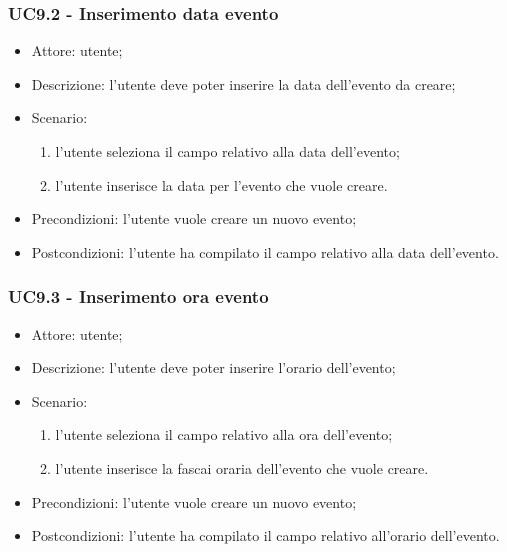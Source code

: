 \subsubsection{UC9.2 - Inserimento data evento} \label{sec: UC9.2}
\begin{itemize}
    \item Attore: utente;
    \item Descrizione: l'utente deve poter inserire la data dell'evento da creare;
    \item Scenario:
        \begin{enumerate}
        \item l'utente seleziona il campo relativo alla data dell'evento;
        \item l'utente inserisce la data per l'evento che vuole creare.
        \end{enumerate}
    
    \item Precondizioni: l'utente vuole creare un nuovo evento;
    \item Postcondizioni: l'utente ha compilato il campo relativo alla data dell'evento.
\end{itemize}


\subsubsection{UC9.3 - Inserimento ora evento} \label{sec: UC9.3}
\begin{itemize}
    \item Attore: utente;
    \item Descrizione: l'utente deve poter inserire l'orario dell'evento;
    \item Scenario:
        \begin{enumerate}
        \item l'utente seleziona il campo relativo alla ora dell'evento;
        \item l'utente inserisce la fascai oraria dell'evento che vuole creare.
        \end{enumerate}
    
    \item Precondizioni: l'utente vuole creare un nuovo evento;
    \item Postcondizioni: l'utente ha compilato il campo relativo all'orario dell'evento.
\end{itemize}

